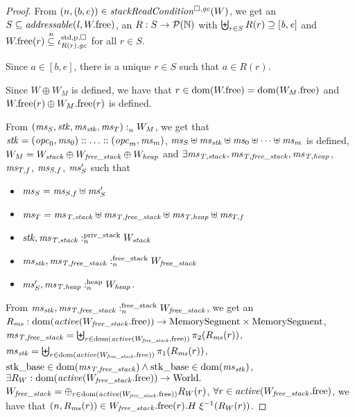 \begin{proof}
  From $\npair{(b,e)}\in\stackReadCond{W}$, we get an $S \subseteq \addressable{\lin,
    \pwfree}$, an $R : S \rightarrow \powerset{\nats}$ with $\biguplus_{r \in S} R(r) \supseteq [\baddr,\eaddr]$ and $\pwfree(r)
  \nsubeq \stdreg{R(r),\gc}{\pur}$ for all $r \in S$.

  Since $a \in [b,e]$, there is a unique $r \in S$ such that $a \in R(r)$.

  Since $W \oplus W_M$ is defined, we have that $r \in \dom(\pwfree) =
  \dom(\pwfree[W_M])$ and $\pwfree(r) \oplus \pwfree[W_M](r)$ is defined.

  From $\memSat{(\ms_S,\stk,\ms_\stk,\ms_T)}{W_M}$, we get that
  $\stk = (\opc_0,\ms_0):: \dots :: (\opc_m,\ms_m)$,
  $\ms_S \uplus \ms_\stk \uplus \ms_0 \uplus \dots \uplus \ms_m$ is defined,
  $W_M = W_{\var{stack}} \oplus W_{\var{free\_stack}} \oplus W_{\var{heap}}$ and
  $\exists \ms_\var{T,stack}, \ms_\var{T,free\_stack}, \ms_\var{T,heap}$, $\ms_{T,f}$, $\ms_{S,f}$, $\ms_S'$ such that
  \begin{itemize}
  \item $\ms_S =\ms_{S,f} \uplus \ms_S'$
  \item $\ms_T = \ms_\var{T,stack} \uplus \ms_\var{T,free\_stack} \uplus
    \ms_\var{T,heap} \uplus \ms_{T,f}$
  \item $\memSatStack{\stk,\ms_\var{T,stack}}{W_{\var{stack}}}$
  \item $\memSatFStack{\ms_\stk,\ms_\var{T,free\_stack}}{W_{\var{free\_stack}}}$
  \item $\memSatHeap{\ms_S',\ms_\var{T,heap}}{W_\var{heap}}$.
  \end{itemize}

  From $\memSatFStack{\ms_\stk,\ms_\var{T,free\_stack}}{W_{\var{free\_stack}}}$, we get an
  $R_\ms : \dom(\activeReg{\pwfree[W_\var{free\_stack}]}) \fun \MemSeg \times \MemSeg$,
  $\ms_\var{T,free\_stack} = \biguplus_{r \in \dom(\activeReg{\pwfree[W_\var{free\_stack}]})} \pi_2(R_\ms(r))$,
  $\ms_\stk = \biguplus_{r \in \dom(\activeReg{\pwfree[W_\var{free\_stack}]})} \pi_1(R_\ms(r))$,
  $\stkb \in \dom(\ms_\var{T,free\_stack}) \wedge \stkb \in \dom(\ms_\stk)$,
  $\exists R_W : \dom(\activeReg{\pwfree[W_\var{free\_stack}]}) \fun \World\ldotp$
  $W_\var{free\_stack} = \oplus_{r \in \dom(\activeReg{\pwfree[W_\var{free\_stack}]})} R_W(r)$,
  $\forall r \in \activeReg{\pwfree[W_\var{free\_stack}]}$, we have that
  $\npair{R_\ms(r)} \in  \pwfree[W_\var{free\_stack}](r).H \; \xi^{-1}(R_W(r))$.


\end{proof}
